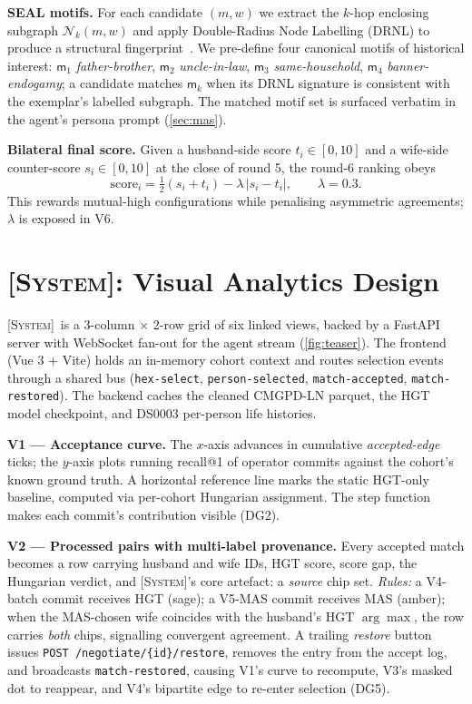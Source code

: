 \documentclass[review]{vgtc}                  %
\newcommand{\system}{\textsc{[System]}\xspace}
\begin{document}
\textbf{SEAL motifs.} For each candidate $(m, w)$ we extract the
$k$-hop enclosing subgraph $\mathcal{N}_k(m, w)$ and apply
Double-Radius Node Labelling (DRNL) to produce a structural
fingerprint~\cite{zhang2018seal}. We pre-define four canonical
motifs of historical interest: $\mathsf{m}_1$ \emph{father-brother},
$\mathsf{m}_2$ \emph{uncle-in-law}, $\mathsf{m}_3$
\emph{same-household}, $\mathsf{m}_4$ \emph{banner-endogamy}; a
candidate matches $\mathsf{m}_k$ when its DRNL signature is consistent
with the exemplar's labelled subgraph. The matched motif set is
surfaced verbatim in the agent's persona prompt (\cref{sec:mas}).

\textbf{Bilateral final score.} Given a husband-side score
$t_i \in [0, 10]$ and a wife-side counter-score $s_i \in [0, 10]$
at the close of round 5, the round-6 ranking obeys
\begin{equation}
\mathrm{score}_i = \tfrac{1}{2} (s_i + t_i)
  - \lambda\,|s_i - t_i|, \qquad \lambda = 0.3.
\label{eq:final}
\end{equation}
This rewards mutual-high configurations while penalising asymmetric
agreements; $\lambda$ is exposed in V6.

\section{\system: Visual Analytics Design}
\label{sec:design}

\system\ is a 3-column $\times$ 2-row grid of six linked views, backed
by a FastAPI server with WebSocket fan-out for the agent stream
(\cref{fig:teaser}). The frontend (Vue 3 + Vite) holds an in-memory
cohort context and routes selection events through a shared bus
(\texttt{hex-select}, \texttt{person-selected},
\texttt{match-accepted}, \texttt{match-restored}). The backend caches
the cleaned CMGPD-LN parquet, the HGT model checkpoint, and DS0003
per-person life histories.

\textbf{V1 --- Acceptance curve.} The $x$-axis advances in cumulative
\emph{accepted-edge} ticks; the $y$-axis plots running recall@1 of
operator commits against the cohort's known ground truth. A
horizontal reference line marks the static HGT-only baseline,
computed via per-cohort Hungarian assignment. The step function
makes each commit's contribution visible (DG2).

\textbf{V2 --- Processed pairs with multi-label provenance.} Every
accepted match becomes a row carrying husband and wife IDs, HGT
score, score gap, the Hungarian verdict, and \system's core artefact:
a \emph{source} chip set. \emph{Rules:} a V4-batch commit receives
\textsf{HGT} (sage); a V5-MAS commit receives \textsf{MAS} (amber);
when the MAS-chosen wife coincides with the husband's HGT
$\arg\max$, the row carries \emph{both} chips, signalling convergent
agreement. A trailing \emph{restore} button issues
\texttt{POST /negotiate/\{id\}/restore}, removes the entry from the
accept log, and broadcasts \texttt{match-restored}, causing V1's
curve to recompute, V3's masked dot to reappear, and V4's bipartite
edge to re-enter selection (DG5).
\end{document}
